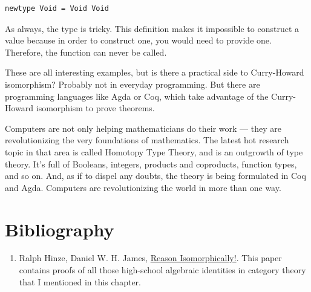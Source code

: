 \begin{Verbatim}[commandchars=\\\{\}]
newtype Void = Void Void
\end{Verbatim}
As always, the type  is tricky. This definition makes it
impossible to construct a value because in order to construct one, you
would need to provide one. Therefore, the function  can
never be called.

These are all interesting examples, but is there a practical side to
Curry-Howard isomorphism? Probably not in everyday programming. But
there are programming languages like Agda or Coq, which take advantage
of the Curry-Howard isomorphism to prove theorems.

Computers are not only helping mathematicians do their work --- they are
revolutionizing the very foundations of mathematics. The latest hot
research topic in that area is called Homotopy Type Theory, and is an
outgrowth of type theory. It's full of Booleans, integers, products and
coproducts, function types, and so on. And, as if to dispel any doubts,
the theory is being formulated in Coq and Agda. Computers are
revolutionizing the world in more than one way.

\section{Bibliography}\label{bibliography}

\begin{enumerate}
\tightlist
\item
  Ralph Hinze, Daniel W. H. James,
  \href{http://www.cs.ox.ac.uk/ralf.hinze/publications/WGP10.pdf}{Reason
  Isomorphically!}. This paper contains proofs of all those high-school
  algebraic identities in category theory that I mentioned in this
  chapter.
\end{enumerate}